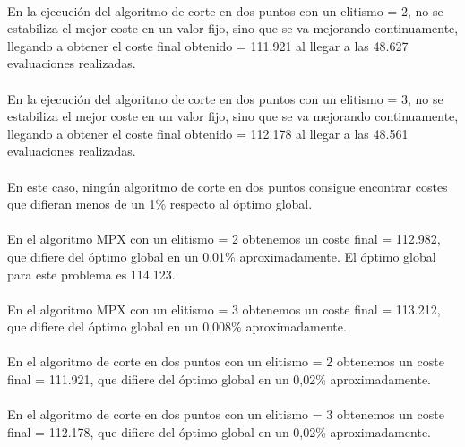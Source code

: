 	\paragraph{}En la ejecución del algoritmo de corte en dos puntos con un elitismo = 2, no se estabiliza el mejor coste en un valor fijo, sino que se va mejorando continuamente, llegando a obtener el coste final obtenido = 111.921 al llegar a las 48.627 evaluaciones realizadas.
	
	\paragraph{}En la ejecución del algoritmo de corte en dos puntos con un elitismo = 3, no se estabiliza el mejor coste en un valor fijo, sino que se va mejorando continuamente, llegando a obtener el coste final obtenido = 112.178 al llegar a las 48.561 evaluaciones realizadas.
	
	\paragraph{}En este caso, ningún algoritmo de corte en dos puntos consigue encontrar costes que difieran menos de un 1\% respecto al óptimo global.
	
	\paragraph{}En el algoritmo MPX con un elitismo = 2 obtenemos un coste final = 112.982, que difiere del óptimo global en un 0,01\% aproximadamente. El óptimo global para este problema es 114.123.
	
	\paragraph{}En el algoritmo MPX con un elitismo = 3 obtenemos un coste final = 113.212, que difiere del óptimo global en un 0,008\% aproximadamente.
	
	\paragraph{}En el algoritmo de corte en dos puntos con un elitismo = 2 obtenemos un coste final = 111.921, que difiere del óptimo global en un 0,02\% aproximadamente.
	
	\paragraph{}En el algoritmo de corte en dos puntos con un elitismo = 3 obtenemos un coste final = 112.178, que difiere del óptimo global en un 0,02\% aproximadamente.
			

